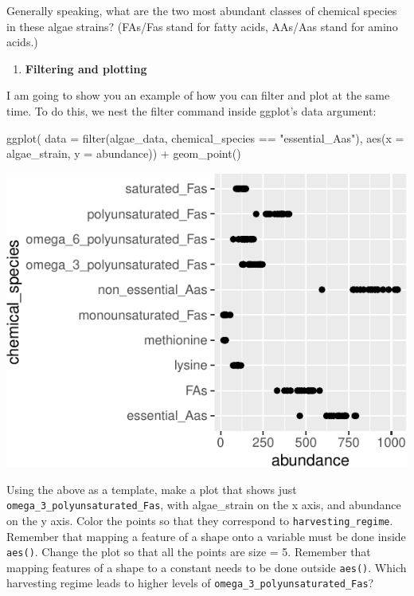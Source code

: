 \documentclass[
]{krantz}
\newenvironment{Shaded}{\begin{snugshade}}{\end{snugshade}}
\newcommand{\AttributeTok}[1]{\textcolor[rgb]{0.77,0.63,0.00}{#1}}
\newcommand{\FunctionTok}[1]{\textcolor[rgb]{0.00,0.00,0.00}{#1}}
\newcommand{\NormalTok}[1]{#1}
\newcommand{\SpecialCharTok}[1]{\textcolor[rgb]{0.00,0.00,0.00}{#1}}
\newcommand{\StringTok}[1]{\textcolor[rgb]{0.31,0.60,0.02}{#1}}
\providecommand{\tightlist}{%
  \setlength{\itemsep}{0pt}\setlength{\parskip}{0pt}}
\begin{document}
Generally speaking, what are the two most abundant classes of chemical species in these algae strains? (FAs/Fas stand for fatty acids, AAs/Aas stand for amino acids.)

\begin{enumerate}
\def\labelenumi{\arabic{enumi}.}
\setcounter{enumi}{5}
\tightlist
\item
  \textbf{Filtering and plotting}
\end{enumerate}

I am going to show you an example of how you can filter and plot at the same time. To do this, we nest the filter command inside ggplot's data argument:

\begin{Shaded}
\begin{Highlighting}[]
\FunctionTok{ggplot}\NormalTok{(}
  \AttributeTok{data =} \FunctionTok{filter}\NormalTok{(algae\_data, chemical\_species }\SpecialCharTok{==} \StringTok{"essential\_Aas"}\NormalTok{),}
  \FunctionTok{aes}\NormalTok{(}\AttributeTok{x =}\NormalTok{ algae\_strain, }\AttributeTok{y =}\NormalTok{ abundance)) }\SpecialCharTok{+}
\FunctionTok{geom\_point}\NormalTok{()}
\end{Highlighting}
\end{Shaded}

\begin{center}\includegraphics{index_files/figure-latex/unnamed-chunk-35-1} \end{center}

Using the above as a template, make a plot that shows just \texttt{omega\_3\_polyunsaturated\_Fas}, with algae\_strain on the x axis, and abundance on the y axis. Color the points so that they correspond to \texttt{harvesting\_regime}. Remember that mapping a feature of a shape onto a variable must be done inside \texttt{aes()}. Change the plot so that all the points are size = 5. Remember that mapping features of a shape to a constant needs to be done outside \texttt{aes()}. Which harvesting regime leads to higher levels of \texttt{omega\_3\_polyunsaturated\_Fas}?
\end{document}
